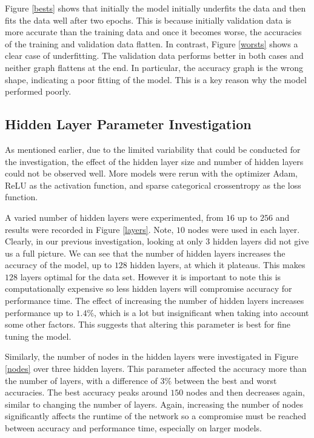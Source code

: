 \documentclass[a4paper,11pt]{article}
\theoremstyle{plain} %
\theoremstyle{definition} %
\theoremstyle{remark} %
\begin{document}
Figure \cref{bests} shows that initially the model initially underfits the data and then fits the data well after two epochs. This is because initially validation data is more accurate than the training data and once it becomes worse, the accuracies of the training and validation data flatten. In contrast, Figure \cref{worsts} shows a clear case of underfitting. The validation data performs better in both cases and neither graph flattens at the end. In particular, the accuracy graph is the wrong shape, indicating a poor fitting of the model. This is a key reason why the model performed poorly.

\subsection{Hidden Layer Parameter Investigation}

As mentioned earlier, due to the limited variability that could be conducted for the investigation, the effect of the hidden layer size and number of hidden layers could not be observed well. More models were rerun with the optimizer Adam, ReLU as the activation function, and sparse categorical crossentropy as the loss function. 

A varied number of hidden layers were experimented, from $16$ up to $256$ and results were recorded in Figure \cref{layers}. Note, $10$ nodes were used in each layer. Clearly, in our previous investigation, looking at only $3$ hidden layers did not give us a full picture. We can see that the number of hidden layers increases the accuracy of the model, up to $128$ hidden layers, at which it plateaus. This makes $128$ layers optimal for the data set. However it is important to note this is computationally expensive so less hidden layers will compromise accuracy for performance time. The effect of increasing the number of hidden layers increases performance up to $1.4\%$, which is a lot but insignificant when taking into account some other factors. This suggests that altering this parameter is best for fine tuning the model.

Similarly, the number of nodes in the hidden layers were investigated in Figure \cref{nodes} over three hidden layers. This parameter affected the accuracy more than the number of layers, with a difference of $3\%$ between the best and worst accuracies. The best accuracy peaks around $150$ nodes and then decreases again, similar to changing the number of layers. Again, increasing the number of nodes significantly affects the runtime of the network so a compromise must be reached between accuracy and performance time, especially on larger models.
\end{document}
